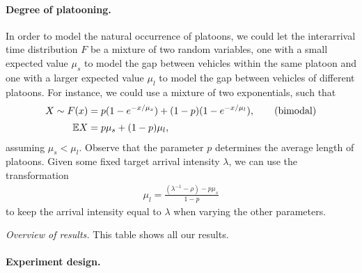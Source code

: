 \documentclass[a4paper]{report}
\theoremstyle{definition}
\theoremstyle{plain}
\begin{document}
\paragraph{Degree of platooning.}
In order to model the natural occurrence of platoons, we could let the interarrival
time distribution $F$ be a mixture of two random variables, one with a small expected
value $\mu_s$ to model the gap between vehicles within the same platoon and one
with a larger expected value $\mu_{l}$ to model the gap between vehicles of
different platoons. For instance, we could use a mixture of two exponentials, such
that
\begin{align}\label{eq:mixture}
  X \sim F(x) &= p ( 1 - e^{-x / \mu_{s}} ) + (1 - p) (1 - e^{-x / \mu_{l}}) , \tag{bimodal} \\[0.2em]
  \mathbb{E}{X} &= p \mu_{s} + (1-p) \mu_{l} , \notag
\end{align}
%
assuming $\mu_{s} < \mu_{l}$. Observe that the parameter $p$ determines the
average length of platoons.
%
Given some fixed target arrival intensity $\lambda$, we can use the transformation
\begin{align*}
  \mu_{l}  = \frac{(\lambda^{-1} - \rho) - p \mu_{s}}{1 - p}
\end{align*}
to keep the arrival intensity equal to $\lambda$ when varying the other
parameters.

\begin{table}
  \caption{\emph{Overview of results.} This table shows all our results.}
\begin{adjustbox}{center}
\scalebox{0.8}{
% 
}
\end{adjustbox}
\end{table}

\paragraph{Experiment design.}
\end{document}
